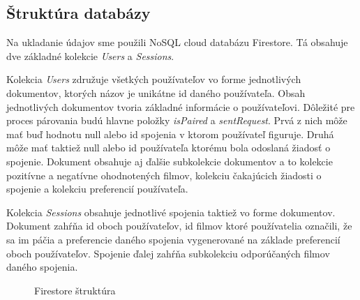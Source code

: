 \subsection{Štruktúra databázy}
Na ukladanie údajov sme použili NoSQL cloud databázu Firestore. Tá obsahuje dve základné kolekcie \textit{Users} a  \textit{Sessions}. 

Kolekcia \textit{Users} združuje všetkých používateľov vo forme jednotlivých dokumentov, ktorých názov je unikátne id daného používateľa. Obsah jednotlivých dokumentov tvoria základné informácie o používateľovi. Dôležité pre proces párovania budú hlavne položky \textit{isPaired} a \textit{sentRequest}. Prvá z nich môže mať buď hodnotu null alebo id spojenia v ktorom používateľ figuruje. Druhá môže mať taktiež null alebo id používateľa ktorému bola odoslaná žiadosť o spojenie. Dokument obsahuje aj ďalšie subkolekcie dokumentov a to kolekcie pozitívne a negatívne ohodnotených filmov, kolekciu čakajúcich žiadosti o spojenie a kolekciu preferencií používateľa.

Kolekcia \textit{Sessions} obsahuje jednotlivé spojenia taktiež vo forme dokumentov. Dokument zahŕňa id oboch používateľov, id filmov ktoré používatelia označili, že sa im páčia a preferencie daného spojenia vygenerované na základe preferencií oboch používateľov. Spojenie ďalej zahŕňa subkolekciu odporúčaných filmov daného spojenia. 
\vspace{55mm}

\begin{figure}[hbt!]
  \centering   
  \def\stackalignment{c}
           \scriptsize
	\caption{Firestore štruktúra}  
  \label{dbstructure}
\end{figure}

